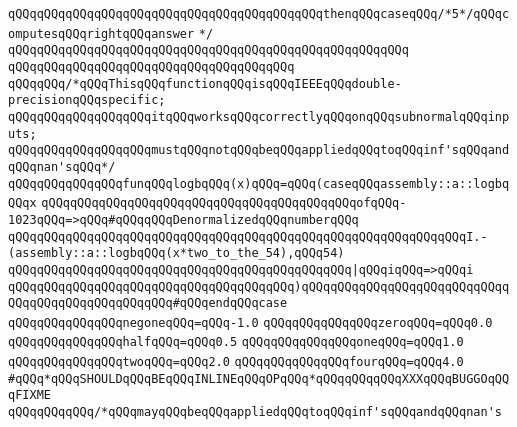 \verb|qQQqqQQqqQQqqQQqqQQqqQQqqQQqqQQqqQQqqQQqqQQqthenqQQqcaseqQQq/*5*/qQQqcomputesqQQqrightqQQqanswer|\newline
\verb|*/|\newline
\verb|qQQqqQQqqQQqqQQqqQQqqQQqqQQqqQQqqQQqqQQqqQQqqQQqqQQqqQQq|\newline
\verb|qQQqqQQqqQQqqQQqqQQqqQQqqQQqqQQqqQQqqQQq|\newline
\newline
\newline
\newline
\verb|qQQqqQQq/*qQQqThisqQQqfunctionqQQqisqQQqIEEEqQQqdouble-precisionqQQqspecific;|\newline
\verb|qQQqqQQqqQQqqQQqqQQqitqQQqworksqQQqcorrectlyqQQqonqQQqsubnormalqQQqinputs;|\newline
\verb|qQQqqQQqqQQqqQQqqQQqmustqQQqnotqQQqbeqQQqappliedqQQqtoqQQqinf'sqQQqandqQQqnan'sqQQq*/|\newline
\verb|qQQqqQQqqQQqqQQqfunqQQqlogbqQQq(x)qQQq=qQQq(caseqQQqassembly::a::logbqQQqx|\newline
\verb|qQQqqQQqqQQqqQQqqQQqqQQqqQQqqQQqqQQqqQQqqQQqofqQQq-1023qQQq=>qQQq#qQQqqQQqDenormalizedqQQqnumberqQQq|\newline
\verb|qQQqqQQqqQQqqQQqqQQqqQQqqQQqqQQqqQQqqQQqqQQqqQQqqQQqqQQqqQQqqQQqI.-(assembly::a::logbqQQq(x*two_to_the_54),qQQq54)|\newline
\verb|qQQqqQQqqQQqqQQqqQQqqQQqqQQqqQQqqQQqqQQqqQQqqQQq|\verb#|qQQqiqQQq=>qQQqi#\newline
\verb|qQQqqQQqqQQqqQQqqQQqqQQqqQQqqQQqqQQqqQQq)qQQqqQQqqQQqqQQqqQQqqQQqqQQqqQQqqQQqqQQqqQQqqQQqqQQq#qQQqendqQQqcase|\newline
\newline
\verb|qQQqqQQqqQQqqQQqnegoneqQQq=qQQq-1.0|\newline
\verb|qQQqqQQqqQQqqQQqzeroqQQq=qQQq0.0|\newline
\verb|qQQqqQQqqQQqqQQqhalfqQQq=qQQq0.5|\newline
\verb|qQQqqQQqqQQqqQQqoneqQQq=qQQq1.0|\newline
\verb|qQQqqQQqqQQqqQQqtwoqQQq=qQQq2.0|\newline
\verb|qQQqqQQqqQQqqQQqfourqQQq=qQQq4.0|\newline
\newline
\verb|#qQQq*qQQqSHOULDqQQqBEqQQqINLINEqQQqOPqQQq*qQQqqQQqqQQqXXXqQQqBUGGOqQQqFIXME|\newline
\verb|qQQqqQQqqQQq/*qQQqmayqQQqbeqQQqappliedqQQqtoqQQqinf'sqQQqandqQQqnan's|\newline
